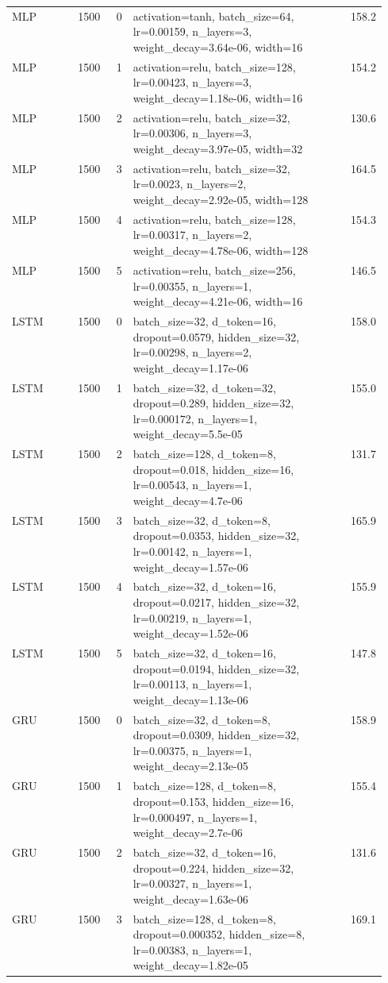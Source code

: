 \begin{longtable}{lrrp{0.55\linewidth}r}
MLP & 1500 & 0 & activation=tanh, batch\_size=64, lr=0.00159, n\_layers=3, weight\_decay=3.64e-06, width=16 & 158.2 \\
MLP & 1500 & 1 & activation=relu, batch\_size=128, lr=0.00423, n\_layers=3, weight\_decay=1.18e-06, width=16 & 154.2 \\
MLP & 1500 & 2 & activation=relu, batch\_size=32, lr=0.00306, n\_layers=3, weight\_decay=3.97e-05, width=32 & 130.6 \\
MLP & 1500 & 3 & activation=relu, batch\_size=32, lr=0.0023, n\_layers=2, weight\_decay=2.92e-05, width=128 & 164.5 \\
MLP & 1500 & 4 & activation=relu, batch\_size=128, lr=0.00317, n\_layers=2, weight\_decay=4.78e-06, width=128 & 154.3 \\
MLP & 1500 & 5 & activation=relu, batch\_size=256, lr=0.00355, n\_layers=1, weight\_decay=4.21e-06, width=16 & 146.5 \\
LSTM & 1500 & 0 & batch\_size=32, d\_token=16, dropout=0.0579, hidden\_size=32, lr=0.00298, n\_layers=2, weight\_decay=1.17e-06 & 158.0 \\
LSTM & 1500 & 1 & batch\_size=32, d\_token=32, dropout=0.289, hidden\_size=32, lr=0.000172, n\_layers=1, weight\_decay=5.5e-05 & 155.0 \\
LSTM & 1500 & 2 & batch\_size=128, d\_token=8, dropout=0.018, hidden\_size=16, lr=0.00543, n\_layers=1, weight\_decay=4.7e-06 & 131.7 \\
LSTM & 1500 & 3 & batch\_size=32, d\_token=8, dropout=0.0353, hidden\_size=32, lr=0.00142, n\_layers=1, weight\_decay=1.57e-06 & 165.9 \\
LSTM & 1500 & 4 & batch\_size=32, d\_token=16, dropout=0.0217, hidden\_size=32, lr=0.00219, n\_layers=1, weight\_decay=1.52e-06 & 155.9 \\
LSTM & 1500 & 5 & batch\_size=32, d\_token=16, dropout=0.0194, hidden\_size=32, lr=0.00113, n\_layers=1, weight\_decay=1.13e-06 & 147.8 \\
GRU & 1500 & 0 & batch\_size=32, d\_token=8, dropout=0.0309, hidden\_size=32, lr=0.00375, n\_layers=1, weight\_decay=2.13e-05 & 158.9 \\
GRU & 1500 & 1 & batch\_size=128, d\_token=8, dropout=0.153, hidden\_size=16, lr=0.000497, n\_layers=1, weight\_decay=2.7e-06 & 155.4 \\
GRU & 1500 & 2 & batch\_size=32, d\_token=16, dropout=0.224, hidden\_size=32, lr=0.00327, n\_layers=1, weight\_decay=1.63e-06 & 131.6 \\
GRU & 1500 & 3 & batch\_size=128, d\_token=8, dropout=0.000352, hidden\_size=8, lr=0.00383, n\_layers=1, weight\_decay=1.82e-05 & 169.1 \\

\end{longtable}
